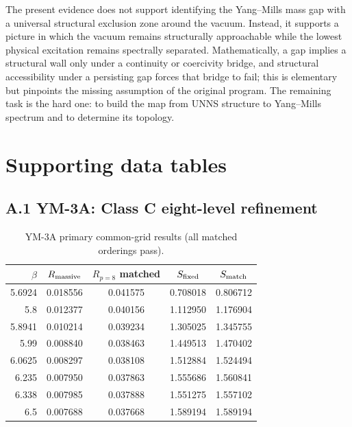 \documentclass[11pt,a4paper]{article}
\theoremstyle{definition}
\theoremstyle{remark}
\newcommand{\uns}{UNNS}
\begin{document}
The present evidence does not support identifying the Yang--Mills mass gap with a universal structural exclusion zone around the vacuum. Instead, it supports a picture in which the vacuum remains structurally approachable while the lowest physical excitation remains spectrally separated. Mathematically, a gap implies a structural wall only under a continuity or coercivity bridge, and structural accessibility under a persisting gap forces that bridge to fail; this is elementary but pinpoints the missing assumption of the original program. The remaining task is the hard one: to build the map from \uns{} structure to Yang--Mills spectrum and to determine its topology.

\appendix
\section{Supporting data tables}\label{app:data}
\subsection*{A.1 YM-3A: Class C eight-level refinement}
\begin{table}[ht]\centering\small\caption{YM-3A primary common-grid results (all matched orderings pass).}\label{tab:ym3a}
\begin{tabular}{@{}rcccc@{}}\toprule $\beta$ & $R_{\rm massive}$ & $R_{p=8}$ matched & $S_{\rm fixed}$ & $S_{\rm match}$\\\midrule
5.6924 & 0.018556 & 0.041575 & 0.708018 & 0.806712\\
5.8 & 0.012377 & 0.040156 & 1.112950 & 1.176904\\
5.8941 & 0.010214 & 0.039234 & 1.305025 & 1.345755\\
5.99 & 0.008840 & 0.038463 & 1.449513 & 1.470402\\
6.0625 & 0.008297 & 0.038108 & 1.512884 & 1.524494\\
6.235 & 0.007950 & 0.037863 & 1.555686 & 1.560841\\
6.338 & 0.007985 & 0.037888 & 1.551275 & 1.557102\\
6.5 & 0.007688 & 0.037668 & 1.589194 & 1.589194\\
\bottomrule\end{tabular}\end{table}
\end{document}

